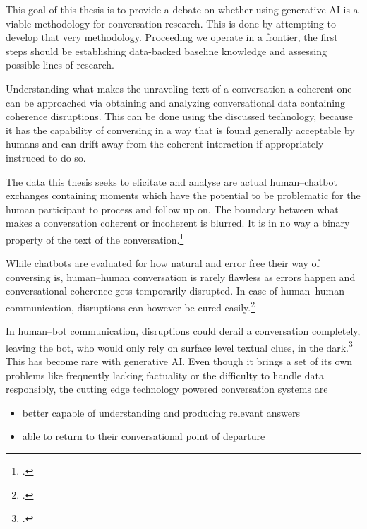\documentclass[12pt]{report}
\begin{document}
\par
This goal of this thesis is to provide a debate on whether
using generative AI is a viable methodology for conversation research.
This is done by attempting to develop that very methodology.
Proceeding we operate in a frontier,
the first steps should be establishing data-backed baseline knowledge
and assessing possible lines of research.

\par
Understanding what makes
the unraveling text of a conversation a coherent one
can be approached via obtaining and analyzing
conversational data containing coherence disruptions.
This can be done using the discussed technology,
because it has the capability of conversing in a way
that is found generally acceptable by humans
and can drift away from the coherent interaction
if appropriately instruced to do so.

\par
The data this thesis seeks to elicitate and analyse are
actual human–chatbot exchanges containing moments which
have the potential to be problematic for
the human participant to process and follow up on.
The boundary between what makes a conversation coherent or incoherent is blurred.
It is in no way a binary property of the text of the conversation.\footcite{givón2020coherence}

\par
While chatbots are evaluated for how natural and error free their way of conversing is,
human–human conversation is rarely flawless as
errors happen and
conversational coherence gets temporarily disrupted.
In case of human–human communication, disruptions can however be cured easily.\footcite{bublitz1999disturbed, DINGEMANSE202430}

\par
In human–bot communication, disruptions could derail a conversation completely,
leaving the bot, who would only rely on surface level textual clues, in the dark.\footcite{mctear2020conversational}
This has become rare with generative AI.
Even though it brings a set of its own problems like
frequently lacking factuality or
the difficulty to handle data responsibly,
the cutting edge technology powered conversation systems are

\begin{itemize}
\item
   better capable of understanding and producing relevant answers

\item
   able to return to their conversational point of departure
\end{itemize}
\end{document}

